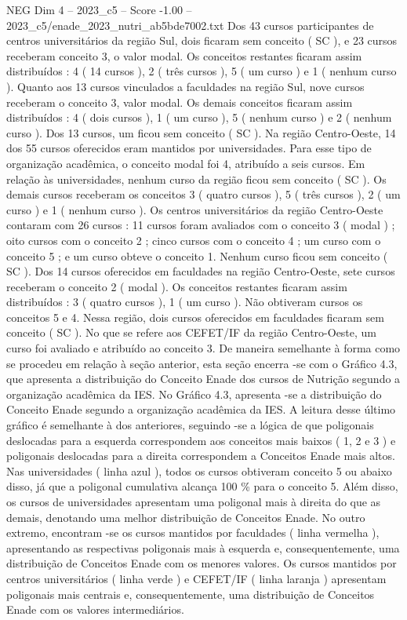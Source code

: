 \begin{textsample}{NEG Dim 4 – 2023\_c5 – Score -1.00 – 2023\_c5/enade\_2023\_nutri\_ab5bde7002.txt}
Dos 43 cursos participantes de centros universitários da região Sul, dois ficaram sem conceito ( SC ), e 23 cursos receberam conceito 3, o valor modal.
Os conceitos restantes ficaram assim distribuídos : 4 ( 14 cursos ), 2 ( três cursos ), 5 ( um curso ) e 1 ( nenhum curso ).
Quanto aos 13 cursos vinculados a faculdades na região Sul, nove cursos receberam o conceito 3, valor modal.
Os demais conceitos ficaram assim distribuídos : 4 ( dois cursos ), 1 ( um curso ), 5 ( nenhum curso ) e 2 ( nenhum curso ).
Dos 13 cursos, um ficou sem conceito ( SC ).
Na região Centro-Oeste, 14 dos 55 cursos oferecidos eram mantidos por universidades.
Para esse tipo de organização acadêmica, o conceito modal foi 4, atribuído a seis cursos.
Em relação às universidades, nenhum curso da região ficou sem conceito ( SC ).
Os demais cursos receberam os conceitos 3 ( quatro cursos ), 5 ( três cursos ), 2 ( um curso ) e 1 ( nenhum curso ).
Os centros universitários da região Centro-Oeste contaram com 26 cursos : 11 cursos foram avaliados com o conceito 3 ( modal ) ; oito cursos com o conceito 2 ; cinco cursos com o conceito 4 ; um curso com o conceito 5 ; e um curso obteve o conceito 1.
Nenhum curso ficou sem conceito ( SC ).
Dos 14 cursos oferecidos em faculdades na região Centro-Oeste, sete cursos receberam o conceito 2 ( modal ).
Os conceitos restantes ficaram assim distribuídos : 3 ( quatro cursos ), 1 ( um curso ).
Não obtiveram cursos os conceitos 5 e 4.
Nessa região, dois cursos oferecidos em faculdades ficaram sem conceito ( SC ).
No que se refere aos CEFET/IF da região Centro-Oeste, um curso foi avaliado e atribuído ao conceito 3.
De maneira semelhante à forma como se procedeu em relação à seção anterior, esta seção encerra -se com o Gráfico 4.3, que apresenta a distribuição do Conceito Enade dos cursos de Nutrição segundo a organização acadêmica da IES.
No Gráfico 4.3, apresenta -se a distribuição do Conceito Enade segundo a organização acadêmica da IES.
A leitura desse último gráfico é semelhante à dos anteriores, seguindo -se a lógica de que poligonais deslocadas para a esquerda correspondem aos conceitos mais baixos ( 1, 2 e 3 ) e poligonais deslocadas para a direita correspondem a Conceitos Enade mais altos.
Nas universidades ( linha azul ), todos os cursos obtiveram conceito 5 ou abaixo disso, já que a poligonal cumulativa alcança 100 \% para o conceito 5.
Além disso, os cursos de universidades apresentam uma poligonal mais à direita do que as demais, denotando uma melhor distribuição de Conceitos Enade.
No outro extremo, encontram -se os cursos mantidos por faculdades ( linha vermelha ), apresentando as respectivas poligonais mais à esquerda e, consequentemente, uma distribuição de Conceitos Enade com os menores valores.
Os cursos mantidos por centros universitários ( linha verde ) e CEFET/IF ( linha laranja ) apresentam poligonais mais centrais e, consequentemente, uma distribuição de Conceitos Enade com os valores intermediários.

\end{textsample}
